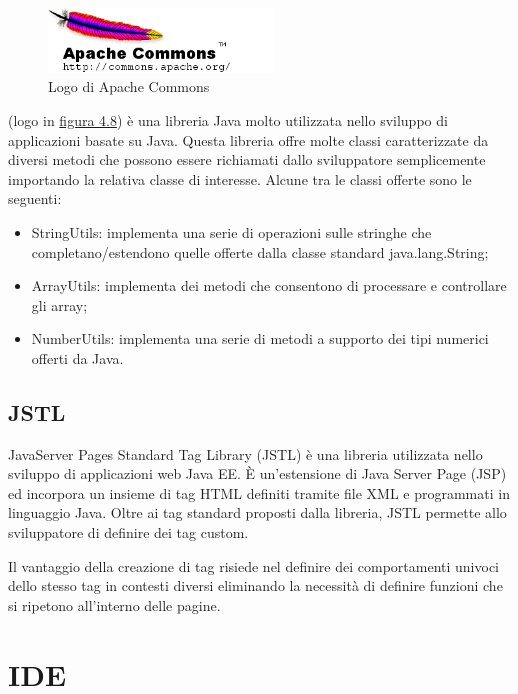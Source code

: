 \begin{figure}[!h]
	\centering
	\includegraphics[width=6cm]{../images/Commons-logo.png}
	\caption{Logo di Apache Commons}
	\label{fig:commons}
\end{figure}

\ap{{[b]}} (logo in {\hyperref[fig:commons]{figura 4.8}}) è una libreria Java molto utilizzata nello sviluppo di applicazioni basate su Java. Questa libreria offre molte classi caratterizzate da diversi metodi che possono essere richiamati dallo sviluppatore semplicemente importando la relativa classe di interesse. Alcune tra le classi offerte sono le seguenti:
\begin{itemize}
\item StringUtils: implementa una serie di operazioni sulle stringhe che completano/estendono quelle offerte dalla classe standard java.lang.String;
\item ArrayUtils: implementa dei metodi che consentono di processare e controllare gli array; 
\item NumberUtils: implementa una serie di metodi a supporto dei tipi numerici offerti da Java.
\end{itemize} 

\subsection{JSTL}
\noindent JavaServer Pages Standard Tag Library (JSTL) è una libreria utilizzata nello sviluppo di applicazioni web Java EE. È un'estensione di Java Server Page (JSP) ed incorpora un insieme di tag HTML definiti tramite file XML e programmati in linguaggio Java. Oltre ai tag standard proposti dalla libreria, JSTL permette allo sviluppatore di definire dei tag custom. 

\setlength{\parskip}{3ex}

\noindent Il vantaggio della creazione di tag risiede nel definire dei comportamenti univoci dello stesso tag in contesti diversi eliminando la necessità di definire funzioni che si ripetono all'interno delle pagine.

\section{IDE}

